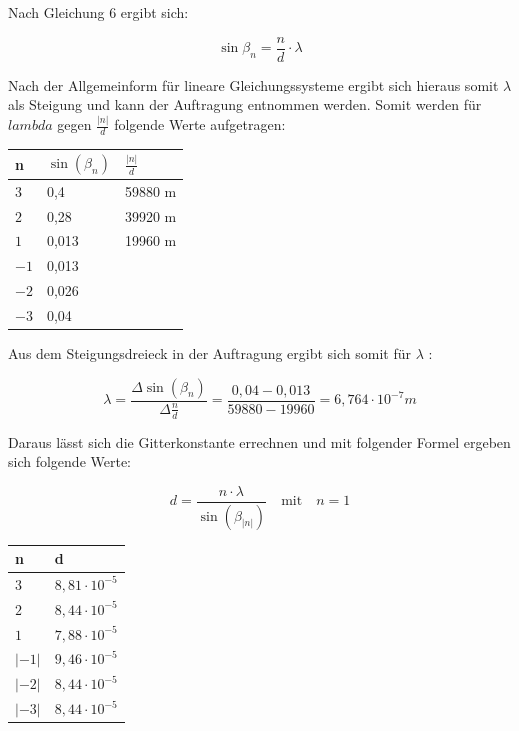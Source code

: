 \documentclass[12pt,a4paper,titlepage,headinclude,bibtotoc]{scrartcl}
\begin{document}
Nach Gleichung 6 ergibt sich:

\begin{equation}
\sin\beta_n = \frac{n}{d}\cdot \lambda
\end{equation}

Nach der Allgemeinform für lineare Gleichungssysteme ergibt sich hieraus somit $\lambda$ als Steigung und kann der Auftragung entnommen werden. Somit werden für ${lambda}$ gegen $\frac{|n|}{d}$ folgende Werte aufgetragen:

\begin{table} [h]
\centering
\begin{tabular}{|p{4 cm}||p{4 cm}|p{4 cm}}
        \hline
		n & $\sin(\beta_n)$ & $\frac{|n|}{d}$\\
         \hline 
         $3$ & 0,4 & 59880 m  \\
         \hline
         $2$ & 0,28 & 39920 m \\
         \hline
         $1$ & 0,013 & 19960 m\\
         \hline
         $-1$ & 0,013 &    \\
         \hline
         $-2$ & 0,026 &    \\
         \hline             
         $-3$ & 0,04 &    \\
         \hline
\end{tabular}
\end{table}

Aus dem Steigungsdreieck in der Auftragung ergibt sich somit für $\lambda$ :

\begin{equation}
\lambda =  \frac{\Delta \sin(\beta_n)}{\Delta\frac{n}{d}} = \frac{0,04 - 0,013}{59880 - 19960} = 6,764 \cdot 10^{-7} m
\end{equation}

Daraus lässt sich die Gitterkonstante errechnen und mit folgender Formel ergeben sich folgende Werte:

\begin{equation}
d = \dfrac{n\cdot \lambda}{\sin(\beta_|n|)} \quad \mathrm{mit}\quad n= 1 
\end{equation}

\begin{table} [h]
\centering
\begin{tabular}{|p{4 cm}||p{4 cm}|}
        \hline
		n & d \\
         \hline 
         $3$ & $8,81\cdot 10^{-5}$  \\
         \hline
         $2$ & $8,44 \cdot 10 ^{-5}$ \\
         \hline
         $1$ & $7,88\cdot 10^{-5}$\\
         \hline
         $|-1|$ & $9,46 \cdot 10^{-5} $   \\
         \hline
         $|-2|$ & $8,44\cdot 10^{-5}  $  \\
         \hline             
         $|-3|$ & $8,44\cdot 10^{-5}$   \\
         \hline
\end{tabular}
\end{table}
\end{document}

